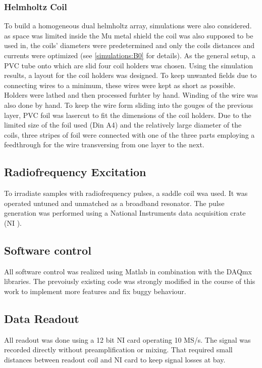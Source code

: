 		\subsubsection{Helmholtz Coil}
		To build a homogeneous dual helmholtz array, simulations were also considered. as space was limited inside the Mu metal shield the coil was also supposed to be used in, the coils' diameters were predetermined and only the coils distances and currents were optimized (see \ref{simulations:B0} for details). As the general setup, a PVC tube onto which are slid four coil holders was chosen. Using the simulation results, a layout for the coil holders was designed. To keep unwanted fields due to connecting wires to a minimum, these wires were kept as short as possible. Holders were lathed and then processed furhter by hand. Winding of the wire was also done by hand. To keep the wire form sliding into the gouges of the previous layer, PVC foil was lasercut to fit the dimensions of the coil holders. Due to the limited size of the foil used (Din A4) and the relatively large diameter of the coils, three stripes of foil were connected with one of the three parts employing a feedthrough for the wire transversing from one layer to the next. 
		\subsection{Radiofrequency Excitation}
			To irradiate samples with radiofrequency pulses, a saddle coil  wsa
			used. It was operated untuned and unmatched as a broadband resonator. The pulse
			generation was performed using a National Instruments data acquisition crate (NI
			). 
		\subsection{Software control}
			All software control was realized using Matlab in combination with the DAQmx libraries.
			The prevoiusly existing code was strongly modified in the course of this work to
			implement more features and fix buggy behaviour.
		\subsection{Data Readout}
			All readout was done using a 12 bit NI  card operating 10 MS/s. The signal
			was recorded directly without preamplification or mixing. That required small distances
			between readout coil and NI card to keep signal losses at bay. 
